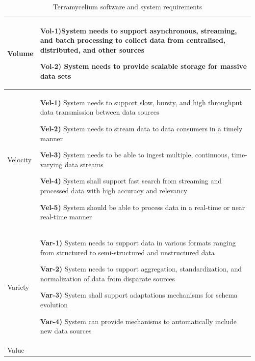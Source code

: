 \documentclass[preprint,12pt]{elsarticle}
\begin{document}
\begin{longtable}{|m{1.4cm}|m{12cm}|}
  \caption{Terramycelium software and system requirements}
  \label{table:systemRequirements}\\
  \hline

          Volume &
  
          \textbf{Vol-1)}\label{vol-1} System needs to support asynchronous, streaming, and batch processing to collect data from centralised, distributed, and other sources
          
          \textbf{Vol-2)} System needs to provide scalable storage for massive data sets 
          \\
          \hline
          Velocity & 
          
          \textbf{Vel-1)} System needs to support slow, bursty, and high throughput data transmission between data sources
          
          \textbf{Vel-2)} System needs to stream data to data consumers in a timely manner
          
          \textbf{Vel-3)} System needs to be able to ingest multiple, continuous, time-varying data streams 
          
          \textbf{Vel-4)} System shall support fast search from streaming and processed data with high accuracy and relevancy 
          
          \textbf{Vel-5)} System should be able to process data in a real-time or near real-time manner 
          \\ 
  
          \hline
  
          Variety & 
  
          \textbf{Var-1)} System needs to support data in various formats ranging from structured to semi-structured and unstructured data 
          
          \textbf{Var-2)} System needs to support aggregation, standardization, and normalization of data from disparate sources
          
          \textbf{Var-3)} System shall support adaptations mechanisms for schema evolution
          
          \textbf{Var-4)} System can provide mechanisms to automatically include new data sources 
          \\
  
          \hline
  
          Value & 
          

\end{longtable}
\end{document}
